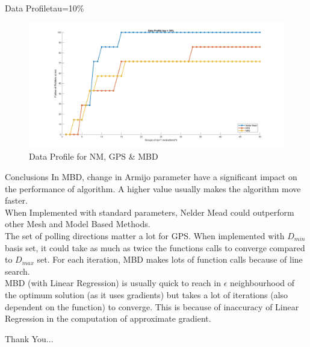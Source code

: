 \documentclass[10pt]{beamer}
\begin{document}
	\begin{frame}{Data Profile}{tau=10\%}
		\begin{figure}
			\includegraphics[width=\linewidth]{dptau10.jpg}
			\caption{Data Profile for NM, GPS \& MBD}
		\end{figure}
	\end{frame}

	\begin{frame}{Conclusions}
		In MBD, change in Armijo parameter have a significant impact on the performance of algorithm. A higher value usually makes the algorithm move faster. \\
		When Implemented with standard parameters, Nelder Mead could outperform other Mesh and Model Based Methods.\\
		The set of polling directions matter a lot for GPS. When implemented with $D_{min}$ basis set, it could take as much as twice the functions calls to converge compared to $D_{max} $ set.
		For each iteration, MBD makes lots of function calls because of line search. \\
		MBD (with Linear Regression) is usually quick to reach in $\epsilon$ neighbourhood of the optimum solution (as it uses gradients) but takes a lot of iterations (also dependent on the function) to converge. This is because of inaccuracy of Linear Regression in the computation of approximate gradient. \\
	\end{frame}
	
	\begin{frame}
		\begin{center}
			\begin{Huge}
				Thank You...
			\end{Huge}
		\end{center}
	\end{frame}
\end{document}
